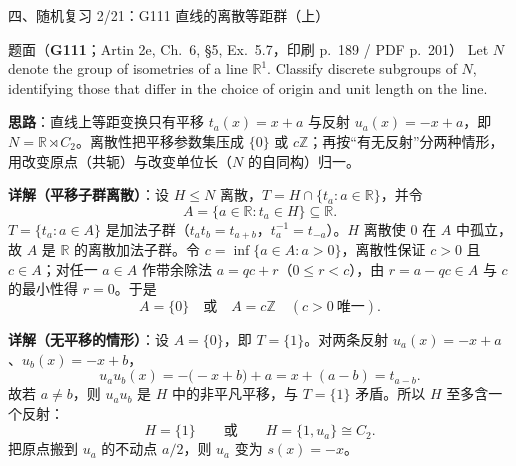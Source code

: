 \documentclass[aspectratio=169,10pt,fontset=none]{ctexbeamer}
\newcommand{\ex}[1]{\textcolor{accent}{\footnotesize\bfseries #1}}
\newcommand{\key}[1]{\textcolor{ink}{\bfseries #1}}
\begin{document}
\begin{frame}[t]{四、随机复习 2/21：G111 直线的离散等距群（上）}
\label{ex:G111}
\scriptsize
\begin{block}{\footnotesize 题面（\ex{G111}；Artin 2e, Ch.~6, §5, Ex.~5.7，印刷 p.~189 / PDF p.~201）}
Let $N$ denote the group of isometries of a line $\mathbb R^1$. Classify discrete subgroups of $N$, identifying those that differ in the choice of origin and unit length on the line.
\end{block}
\key{思路}：直线上等距变换只有平移 $t_a(x)=x+a$ 与反射 $u_a(x)=-x+a$，即 $N=\mathbb R\rtimes C_2$。离散性把平移参数集压成 $\{0\}$ 或 $c\mathbb Z$；再按“有无反射”分两种情形，用改变原点（共轭）与改变单位长（$N$ 的自同构）归一。

\key{详解（平移子群离散）}：设 $H\le N$ 离散，$T=H\cap\{t_a:a\in\mathbb R\}$，并令
\[ A=\{a\in\mathbb R:t_a\in H\}\subseteq\mathbb R. \]
$T=\{t_a:a\in A\}$ 是加法子群（$t_at_b=t_{a+b}$，$t_a^{-1}=t_{-a}$）。$H$ 离散使 $0$ 在 $A$ 中孤立，故 $A$ 是 $\mathbb R$ 的离散加法子群。令 $c=\inf\{a\in A:a>0\}$，离散性保证 $c>0$ 且 $c\in A$；对任一 $a\in A$ 作带余除法 $a=qc+r$（$0\le r<c$），由 $r=a-qc\in A$ 与 $c$ 的最小性得 $r=0$。于是
\[ A=\{0\}\quad\text{或}\quad A=c\mathbb Z\quad(c>0\ \text{唯一}). \]

\key{详解（无平移的情形）}：设 $A=\{0\}$，即 $T=\{1\}$。对两条反射 $u_a(x)=-x+a$、$u_b(x)=-x+b$，
\[ u_a u_b(x)=-\bigl(-x+b\bigr)+a=x+(a-b)=t_{a-b}. \]
故若 $a\ne b$，则 $u_au_b$ 是 $H$ 中的非平凡平移，与 $T=\{1\}$ 矛盾。所以 $H$ 至多含一个反射：
\[ H=\{1\}\qquad\text{或}\qquad H=\{1,u_a\}\cong C_2. \]
把原点搬到 $u_a$ 的不动点 $a/2$，则 $u_a$ 变为 $s(x)=-x$。
\end{frame}
\end{document}
